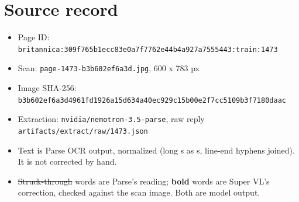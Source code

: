 \documentclass[10pt]{article}
\begin{document}
\section*{Source record}
\begin{itemize}
\item Page ID: \texttt{britannica:309f765b1ecc83e0a7f7762e44b4a927a7555443:train:1473}
\item Scan: \texttt{page-1473-b3b602ef6a3d.jpg}, 600 x 783 px
\item Image SHA-256: \texttt{\small b3b602ef6a3d4961fd1926a15d634a40ec929c15b00e2f7cc5109b3f7180daac}
\item Extraction: \texttt{nvidia/nemotron-3.5-parse}, raw reply \texttt{artifacts/extract/raw/1473.json}
\item Text is Parse OCR output, normalized (long s as s, line-end hyphens joined). It is not corrected by hand.
\item \sout{Struck-through} words are Parse's reading; \textbf{bold} words are Super VL's correction, checked against the scan image. Both are model output.
\end{itemize}
\end{document}
